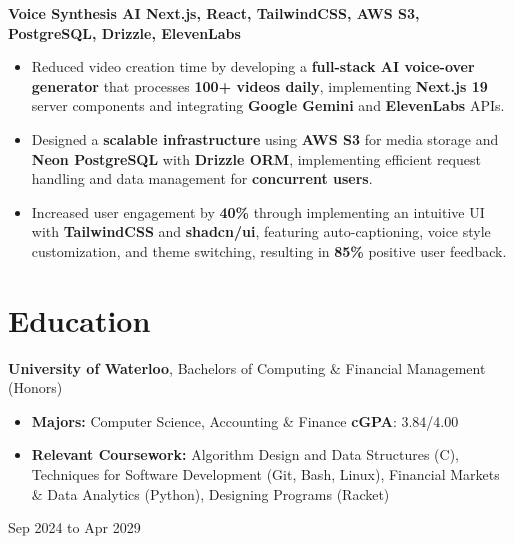 \documentclass[10pt, letterpaper]{article}
\newenvironment{highlights}{
    \begin{itemize}[
        topsep=0.10 cm,
        parsep=0.10 cm,
        partopsep=0pt,
        itemsep=0pt,
        leftmargin=0.4 cm + 10pt
    ]
}{
    \end{itemize}
} %
\newenvironment{twocolentry}[2][]{
    \onecolentry
    \def\secondColumn{#2}
    \setcolumnwidth{\fill, 2.5 cm}
    \begin{paracol}{2}
}{
    \switchcolumn \raggedleft \secondColumn
    \end{paracol}
    \endonecolentry
} %
\newenvironment{threecolentry}[3][]{
    \onecolentry
    \def\thirdColumn{#3}
    \setcolumnwidth{1 cm, \fill, 2.5 cm}
    \begin{paracol}{3}
    {\raggedright #2} \switchcolumn
}{
    \switchcolumn \raggedleft \thirdColumn
    \end{paracol}
    \endonecolentry
} %
\let\hrefWithoutArrow\href
\renewcommand{\href}[2]{\hrefWithoutArrow{#1}{\ifthenelse{\equal{#2}{}}{ }{#2 }\raisebox{.15ex}{\footnotesize \faExternalLink*}}}
\begin{document}
        \vspace{0.05 cm}

        \begin{twocolentry}{
            \href{https://github.com/akramj13/voice-synthesis-ai}{GitHub Link}
        }
            \textbf{Voice Synthesis AI \hfill Next.js, React, TailwindCSS, AWS S3, PostgreSQL, Drizzle, ElevenLabs}
            \begin{highlights}
                \item Reduced video creation time by developing a \textbf{full-stack AI voice-over generator} that processes \textbf{100+ videos daily}, implementing \textbf{Next.js 19} server components and integrating \textbf{Google Gemini} and \textbf{ElevenLabs} APIs.
                \item Designed a \textbf{scalable infrastructure} using \textbf{AWS S3} for media storage and \textbf{Neon PostgreSQL} with \textbf{Drizzle ORM}, implementing efficient request handling and data management for \textbf{concurrent users}.
                \item Increased user engagement by \textbf{40\%} through implementing an intuitive UI with \textbf{TailwindCSS} and \textbf{shadcn/ui}, featuring auto-captioning, voice style customization, and theme switching, resulting in \textbf{85\%} positive user feedback.
            \end{highlights}
        \end{twocolentry}



    
    \section{Education}



        
        \begin{threecolentry}{\textbf{}}{
            Sep 2024 to Apr 2029
        }
            \textbf{University of Waterloo}, Bachelors of Computing \& Financial Management (Honors)
            \begin{highlights}
                \item \textbf{Majors:} Computer Science, Accounting \& Finance \hfill \textbf{cGPA}: 3.84/4.00
                \item \textbf{Relevant Coursework:} Algorithm Design and Data Structures (C), Techniques for Software Development (Git, Bash, Linux), Financial Markets \& Data Analytics (Python), Designing Programs (Racket)
            \end{highlights}
        \end{threecolentry}


    
\end{document}
